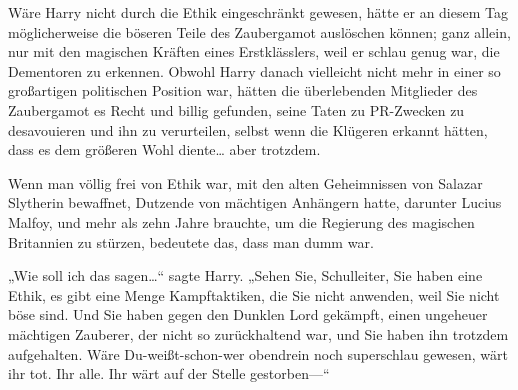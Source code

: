 Wäre Harry nicht durch die Ethik eingeschränkt gewesen, hätte er an diesem Tag möglicherweise die böseren Teile des Zaubergamot auslöschen können; ganz allein, nur mit den magischen Kräften eines Erstklässlers, weil er schlau genug war, die Dementoren zu erkennen. Obwohl Harry danach vielleicht nicht mehr in einer so großartigen politischen Position war, hätten die überlebenden Mitglieder des Zaubergamot es Recht und billig gefunden, seine Taten zu PR-Zwecken zu desavouieren und ihn zu verurteilen, selbst wenn die Klügeren erkannt hätten, dass es dem größeren Wohl diente… aber trotzdem.

Wenn man völlig frei von Ethik war, mit den alten Geheimnissen von Salazar Slytherin bewaffnet, Dutzende von mächtigen Anhängern hatte, darunter Lucius Malfoy, und mehr als zehn Jahre brauchte, um die Regierung des magischen Britannien zu stürzen, bedeutete das, dass man dumm war.

„Wie soll ich das sagen…“ sagte Harry. „Sehen Sie, Schulleiter, Sie haben eine Ethik, es gibt eine Menge Kampftaktiken, die Sie nicht anwenden, weil Sie nicht böse sind. Und Sie haben gegen den Dunklen Lord gekämpft, einen ungeheuer mächtigen Zauberer, der nicht so zurückhaltend war, und Sie haben ihn trotzdem aufgehalten. Wäre Du-weißt-schon-wer obendrein noch superschlau gewesen, wärt ihr tot. Ihr alle. Ihr wärt auf der Stelle gestorben—“


